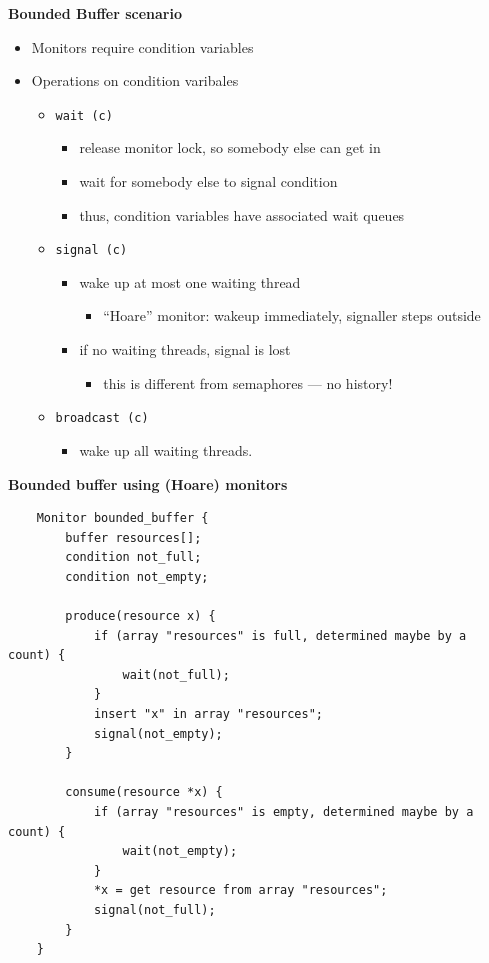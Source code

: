 \documentclass[11pt,a4paper]{article}
\begin{document}
\textbf{Bounded Buffer scenario}
\begin{itemize}
    \item Monitors require condition variables
    \item Operations on condition varibales
        \begin{itemize}
            \item \texttt{wait\,(c)}
                \begin{itemize}
                    \item release monitor lock, so somebody else can get in
                    \item wait for somebody else to signal condition
                    \item thus, condition variables have associated wait queues
                \end{itemize}
            \item \texttt{signal\,(c)}
                \begin{itemize}
                    \item wake up at most one waiting thread
                        \begin{itemize}
                            \item ``Hoare'' monitor: wakeup immediately, signaller steps
                                outside
                        \end{itemize}
                    \item if no waiting threads, signal is lost
                        \begin{itemize}
                            \item this is different from semaphores --- no history!
                        \end{itemize}
                \end{itemize}
            \item \texttt{broadcast\,(c)}
                \begin{itemize}
                        \item wake up all waiting threads.
                \end{itemize}
        \end{itemize}
\end{itemize}

\textbf{Bounded buffer using (Hoare) monitors}
\begin{verbatim}
    Monitor bounded_buffer {
        buffer resources[];
        condition not_full;
        condition not_empty;

        produce(resource x) {
            if (array "resources" is full, determined maybe by a count) {
                wait(not_full);
            }
            insert "x" in array "resources";
            signal(not_empty);
        }

        consume(resource *x) {
            if (array "resources" is empty, determined maybe by a count) {
                wait(not_empty);
            }
            *x = get resource from array "resources";
            signal(not_full);
        }
    }
\end{verbatim}
\end{document}
